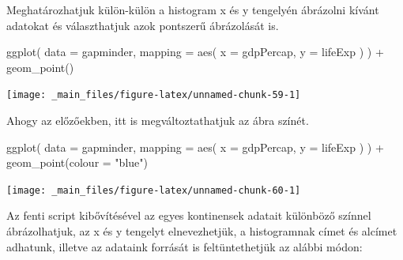 \documentclass[
]{book}
\newenvironment{Shaded}{\begin{snugshade}}{\end{snugshade}}
\newcommand{\AttributeTok}[1]{\textcolor[rgb]{0.77,0.63,0.00}{#1}}
\newcommand{\FunctionTok}[1]{\textcolor[rgb]{0.00,0.00,0.00}{#1}}
\newcommand{\NormalTok}[1]{#1}
\newcommand{\SpecialCharTok}[1]{\textcolor[rgb]{0.00,0.00,0.00}{#1}}
\newcommand{\StringTok}[1]{\textcolor[rgb]{0.31,0.60,0.02}{#1}}
\begin{document}
Meghatározhatjuk külön-külön a histogram x és y tengelyén ábrázolni
kívánt adatokat és választhatjuk azok pontszerű ábrázolását is.

\begin{Shaded}
\begin{Highlighting}[]
\FunctionTok{ggplot}\NormalTok{(}
  \AttributeTok{data =}\NormalTok{ gapminder,}
  \AttributeTok{mapping =} \FunctionTok{aes}\NormalTok{(}
    \AttributeTok{x =}\NormalTok{ gdpPercap,}
    \AttributeTok{y =}\NormalTok{ lifeExp}
\NormalTok{  )}
\NormalTok{) }\SpecialCharTok{+}
  \FunctionTok{geom\_point}\NormalTok{()}
\end{Highlighting}
\end{Shaded}

\begin{center}\texttt{[image: \_main\_files/figure-latex/unnamed-chunk-59-1]} \end{center}

Ahogy az előzőekben, itt is megváltoztathatjuk az ábra színét.

\begin{Shaded}
\begin{Highlighting}[]
\FunctionTok{ggplot}\NormalTok{(}
  \AttributeTok{data =}\NormalTok{ gapminder,}
  \AttributeTok{mapping =} \FunctionTok{aes}\NormalTok{(}
    \AttributeTok{x =}\NormalTok{ gdpPercap,}
    \AttributeTok{y =}\NormalTok{ lifeExp}
\NormalTok{  )}
\NormalTok{) }\SpecialCharTok{+}
  \FunctionTok{geom\_point}\NormalTok{(}\AttributeTok{colour =} \StringTok{"blue"}\NormalTok{)}
\end{Highlighting}
\end{Shaded}

\begin{center}\texttt{[image: \_main\_files/figure-latex/unnamed-chunk-60-1]} \end{center}

Az fenti script kibővítésével az egyes kontinensek adatait különböző
színnel ábrázolhatjuk, az x és y tengelyt elnevezhetjük, a histogramnak
címet és alcímet adhatunk, illetve az adataink forrását is
feltüntethetjük az alábbi módon:

\begin{Shaded}
\end{Shaded}
\end{document}
